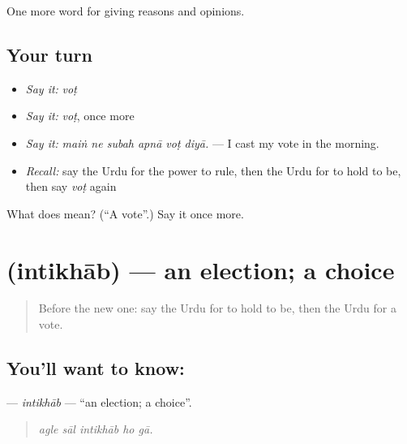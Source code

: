 \begin{grammarlens}[title={What you've built}]
One more word for giving reasons and opinions.
\end{grammarlens}

\subsection*{Your turn}
\begin{itemize}
\raggedright
  \item \emph{Say it:} \emph{voṭ}
  \item \emph{Say it:} \emph{voṭ}, once more
  \item \emph{Say it:} \emph{maiṅ ne subah apnā voṭ diyā.} — I cast my vote in the morning.
  \item \emph{Recall:} say the Urdu for the power to rule, then the Urdu for to hold to be, then say \emph{voṭ} again
\end{itemize}

\begin{tcolorbox}[breakable,colback=teal!4,colframe=teal!35!black,title={Before you move on}]
What does  mean? (\textquotedblleft{}A vote\textquotedblright{}.) Say it once more.
\end{tcolorbox}
\section[\texorpdfstring{\ur{انتخاب} (intikhāb)}{انتخاب (intikhāb)}]{ (intikhāb) — an election; a choice}

\label{lesson:UR-C342-intikhab}



\begin{quote}
Before the new one: say the Urdu for to hold to be, then the Urdu for a vote.
\end{quote}

\subsection*{You'll want to know: }
\textbf{} — \emph{intikhāb} — \textquotedblleft{}an election; a choice\textquotedblright{}.

\begin{quote}
    
\end{quote}

\begin{quote}
\emph{agle sāl intikhāb ho gā.}
\end{quote}

